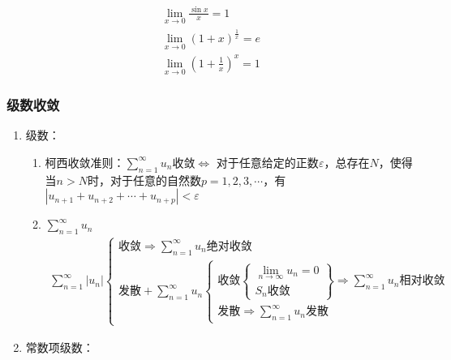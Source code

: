 \documentclass[12pt]{book}
\begin{document}
\begin{gather*}
    \lim_{x\rightarrow 0}{\frac{\sin{x}}{x}} = 1 \\
    \lim_{x\rightarrow 0}{(1+x)^{\frac{1}{x}}} = e \\
    \lim_{x\rightarrow 0}{(1+\frac{1}{x})^{x}} = 1
\end{gather*}


\subsubsection{级数收敛}


\begin{enumerate}[1.]
    \item 级数：
          \begin{enumerate}[(1)]
              \item 柯西收敛准则：$\sum_{n=1}^{\infty}{u_n}$收敛$\Leftrightarrow$ 对于任意给定的正数$\varepsilon$，总存在$N$，使得当$n>N$时，对于任意的自然数$p=1,2,3,\cdots$，有$|u_{n+1}+u_{n+2}+\cdots+u_{n+p}|<\varepsilon$
              \item $\sum_{n=1}^{\infty}{u_n}$
              \begin{gather*}
                \sum_{n=1}^{\infty}{|u_n|} 
                \begin{cases}
                    \text{收敛}\Rightarrow \sum_{n=1}^{\infty}{u_n}\text{绝对收敛}\\
                    \text{发散}+\sum_{n=1}^{\infty}{u_n}\begin{cases}
                         \text{收敛}\left.\begin{cases}
                            \lim\limits_{n\rightarrow\infty}{u_n}=0 \\
                            S_n\text{收敛}
                        \end{cases}\right\}\Rightarrow \sum_{n=1}^{\infty}{u_n}\text{相对收敛} \\
                        \text{发散}\Rightarrow \sum_{n=1}^{\infty}{u_n}\text{发散}
                    \end{cases}
                \end{cases} 
              \end{gather*}
          \end{enumerate}
    \item 常数项级数：

\end{enumerate}
\end{document}
